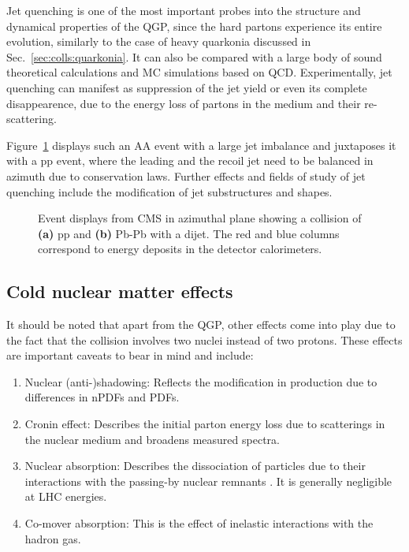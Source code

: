 Jet quenching is one of the most important probes into the structure and dynamical properties of the QGP, since the hard partons experience its entire evolution, similarly to the case of heavy quarkonia discussed in Sec.~\ref{sec:colls:quarkonia}. It can also be compared with a large body of sound theoretical calculations \cite{gyulassyNonAbelianEnergyLoss2000} and MC simulations \cite{zappMonteCarloModel2009} based on QCD. Experimentally, jet quenching can manifest as suppression of the jet yield or even its complete disappearence, due to the energy loss of partons in the medium and their re-scattering. \cite{alicecollaborationALICEExperimentJourney2022}

Figure~\ref{fig:colls:jetquenching} displays such an AA event with a large jet imbalance and juxtaposes it with a pp event, where the leading and the recoil jet need to be balanced in azimuth due to conservation laws. Further effects and fields of study of jet quenching include the modification of jet substructures and shapes.

\begin{figure}[H]
\hspace{2em} 
\caption{Event displays from CMS in azimuthal plane showing a collision of \textbf{(a)} pp and \textbf{(b)} Pb-Pb with a dijet. The red and blue columns correspond to energy deposits in the detector calorimeters. \cite{cmsCMSCollisionEvents2010, niidaSignaturesQGPRHIC2021}}
\label{fig:colls:jetquenching}
\end{figure}

\subsection{Cold nuclear matter effects}

It should be noted that apart from the QGP, other effects come into play due to the fact that the collision involves two nuclei instead of two protons. These effects are important caveats to bear in mind and include:

\begin{enumerate}
\item Nuclear (anti-)shadowing: Reflects the modification in production due to differences in nPDFs and PDFs. \cite{vogtShadowingEffectsPsi2015}
\item Cronin effect: Describes the initial parton energy loss due to scatterings in the nuclear medium and broadens measured \pt spectra. \cite{croninProductionHadronsLarge1975}
\item Nuclear absorption: Describes the dissociation of particles due to their interactions with the passing-by nuclear remnants \cite{wongIntroductionHighenergyHeavyion1990}. It is generally negligible at LHC energies.
\item Co-mover absorption: This is the effect of inelastic interactions with the hadron gas. \cite{ferreiroExcitedCharmoniumSuppression2015}
\end{enumerate}

